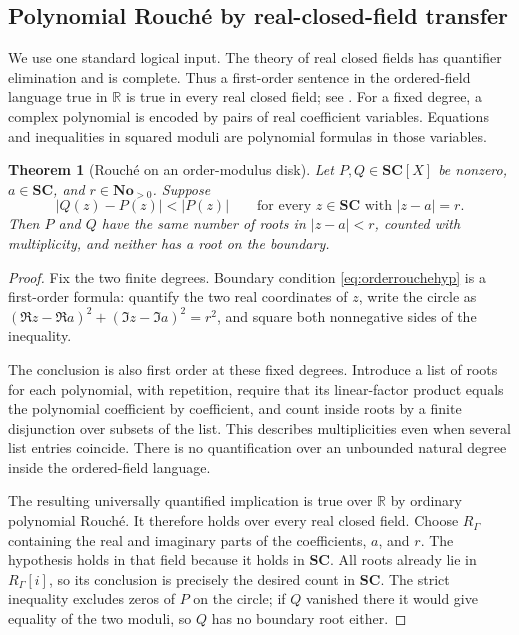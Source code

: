 \documentclass[11pt,letterpaper]{article}
\numberwithin{equation}{section}
\newtheorem{theorem}{Theorem}[section]
\theoremstyle{definition}
\theoremstyle{remark}
\newcommand{\No}{\mathbf{No}}
\newcommand{\SC}{\mathbf{SC}}
\newcommand{\R}{\mathbb R}
\begin{document}
\subsection{Polynomial Rouch\'e by real-closed-field transfer}
We use one standard logical input. The theory of real closed fields has
quantifier elimination and is complete. Thus a first-order sentence in
the ordered-field language true in $\R$ is true in every real closed
field; see \cite{Tarski,CohenMahboubi}. For a fixed degree, a complex polynomial is
encoded by pairs of real coefficient variables. Equations and inequalities
in squared moduli are polynomial formulas in those variables.

\begin{theorem}[Rouch\'e on an order-modulus disk]\label{thm:orderrouche}
Let $P,Q\in\SC[X]$ be nonzero, $a\in\SC$, and $r\in\No_{>0}$. Suppose
\begin{equation}\label{eq:orderrouchehyp}
 |Q(z)-P(z)|<|P(z)|\qquad\text{for every }z\in\SC
 \text{ with }|z-a|=r.
\end{equation}
Then $P$ and $Q$ have the same number of roots in $|z-a|<r$, counted with
multiplicity, and neither has a root on the boundary.
\end{theorem}
\begin{proof}
Fix the two finite degrees. Boundary condition \eqref{eq:orderrouchehyp}
is a first-order formula: quantify the two real coordinates of $z$, write
the circle as $(\Re z-\Re a)^2+(\Im z-\Im a)^2=r^2$, and square both
nonnegative sides of the inequality.

The conclusion is also first order at these fixed degrees. Introduce a
list of roots for each polynomial, with repetition, require that its
linear-factor product equals the polynomial coefficient by coefficient,
and count inside roots by a finite disjunction over subsets of the list.
This describes multiplicities even when several list entries coincide.
There is no quantification over an unbounded natural degree inside the
ordered-field language.

The resulting universally quantified implication is true over $\R$ by
ordinary polynomial Rouch\'e. It therefore holds over every real closed
field. Choose $R_\Gamma$ containing the real and imaginary parts of the
coefficients, $a$, and $r$. The hypothesis holds in that field because it
holds in $\SC$. All roots already lie in $R_\Gamma[i]$, so its conclusion
is precisely the desired count in $\SC$. The strict inequality excludes
zeros of $P$ on the circle; if $Q$ vanished there it would give equality of
the two moduli, so $Q$ has no boundary root either.
\end{proof}
\end{document}
